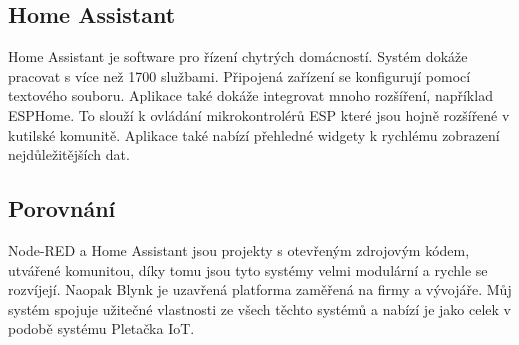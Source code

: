 \subsection{Home Assistant}
Home Assistant je software pro řízení chytrých domácností. 
Systém dokáže pracovat s více než 1700 službami.
Připojená zařízení se konfigurují pomocí textového souboru.
Aplikace také dokáže integrovat mnoho rozšíření, například ESPHome.
To slouží k ovládání mikrokontrolérů ESP které jsou hojně rozšířené v kutilské komunitě.
Aplikace také nabízí přehledné widgety k rychlému zobrazení nejdůležitějších dat. 


\subsection{Porovnání}
Node-RED a Home Assistant jsou projekty s otevřeným zdrojovým kódem, utvářené komunitou, díky tomu jsou tyto systémy velmi modulární a rychle se rozvíjejí. %
Naopak Blynk je uzavřená platforma zaměřená na firmy a vývojáře.
Můj systém spojuje užitečné vlastnosti ze všech těchto systémů a nabízí je jako celek v podobě systému Pletačka IoT.
